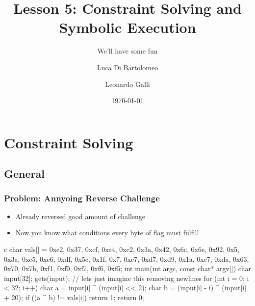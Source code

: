 \documentclass[aspectratio=169]{beamer}
\title{Lesson 5: Constraint Solving and Symbolic Execution}
\subtitle{We'll have some fun}
\author{Luca Di Bartolomeo \and Leonardo Galli}
\date{\today}
\begin{document}
 
\titleframe

\tocframe


{
\hidesectionframe
\showsubsectionframe
\section{Constraint Solving}
\subsection{General}

\begin{frame}[fragile]
    \frametitle{Problem: Annyoing Reverse Challenge}
    \begin{itemize}
        \item Already reversed good amount of challenge
        \item Now you know what conditions every byte of flag must fulfill
    \end{itemize}
    \begin{codebox}{c}
char vals[] = {0xe2, 0x37, 0xcf, 0xe4, 0xc2, 0x3a, 0x42, 0x6c, 0x6e, 0x92,
    0x5, 0x3a, 0xc5, 0xe6, 0xdf, 0x5c, 0x1f, 0x7, 0xe7, 0xd7, 0xd9, 0x1a,
    0xc7, 0xda, 0x63, 0x70, 0x7b, 0xf1, 0xf0, 0xf7, 0xf6, 0xf5};
int main(int argc, const char* argv[]) {
    char input[32];
    gets(input); // lets just imagine this removing newlines
    for (int i = 0; i < 32; i++) {
        char a = input[i] ^ (input[i] << 2);
        char b = (input[i] - i) ^ (input[i] + 20);
        if ((a ^ b) != vals[i]) return 1;
    }
    return 0;
}\end{codebox}
\end{frame}

}
\end{document}
